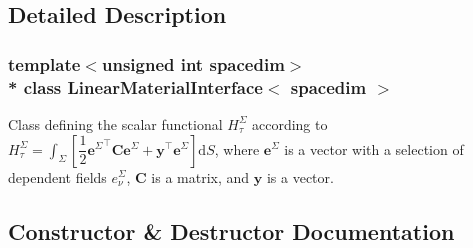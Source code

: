 \subsection{Detailed Description}
\subsubsection*{template$<$unsigned int spacedim$>$\\*
class Linear\+Material\+Interface$<$ spacedim $>$}

Class defining the scalar functional $H^\Sigma_\tau$ according to $H^\Sigma_\tau=\int_\Sigma \left[ \dfrac{1}{2} {\boldsymbol{e}^\Sigma}^\top \boldsymbol{C} {\boldsymbol{e}^\Sigma} + \boldsymbol{y}^\top \boldsymbol{e}^\Sigma \right] \mathrm{d}S$, where $\boldsymbol{e}^\Sigma$ is a vector with a selection of dependent fields $e^\Sigma_\nu$, $\boldsymbol{C}$ is a matrix, and $\boldsymbol{y}$ is a vector. 

\subsection{Constructor \& Destructor Documentation}
